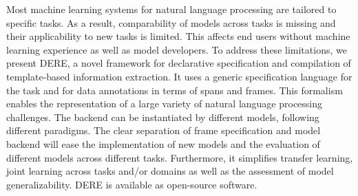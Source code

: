 Most machine learning systems for natural language processing are tailored to specific tasks. As a result, comparability of models across tasks is missing and their applicability to new tasks is limited. This affects end users without machine learning experience as well as model developers. To address these limitations, we present DERE, a novel framework for declarative specification and compilation of template-based information extraction. It uses a generic specification language for the task and for data annotations in terms of spans and frames. This formalism enables the representation of a large variety of natural language processing challenges. The backend can be instantiated by different models, following different paradigms. The clear separation of frame specification and model backend will ease the implementation of new models and the evaluation of different models across different tasks. Furthermore, it simplifies transfer learning, joint learning across tasks and/or domains as well as the assessment of model generalizability. DERE is available as open-source software.

